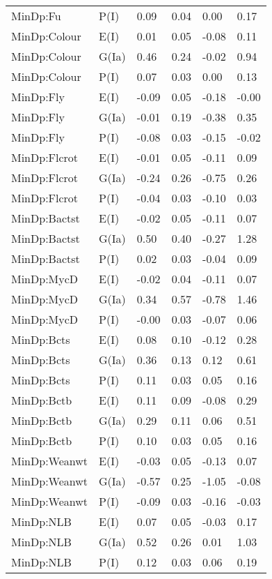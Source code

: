 \begin{center}
\begin{longtable}{|p{1.1in}|p{0.7in}|p{0.7in}|p{0.6in}|p{0.6in}|p{0.6in}|}
  MinDp:Fu & P(I) & 0.09 & 0.04 & 0.00 & 0.17 \\ 
  MinDp:Colour & E(I) & 0.01 & 0.05 & -0.08 & 0.11 \\ 
  MinDp:Colour & G(Ia) & 0.46 & 0.24 & -0.02 & 0.94 \\ 
  MinDp:Colour & P(I) & 0.07 & 0.03 & 0.00 & 0.13 \\ 
  MinDp:Fly & E(I) & -0.09 & 0.05 & -0.18 & -0.00 \\ 
  MinDp:Fly & G(Ia) & -0.01 & 0.19 & -0.38 & 0.35 \\ 
  MinDp:Fly & P(I) & -0.08 & 0.03 & -0.15 & -0.02 \\ 
  MinDp:Flcrot & E(I) & -0.01 & 0.05 & -0.11 & 0.09 \\ 
  MinDp:Flcrot & G(Ia) & -0.24 & 0.26 & -0.75 & 0.26 \\ 
  MinDp:Flcrot & P(I) & -0.04 & 0.03 & -0.10 & 0.03 \\ 
  MinDp:Bactst & E(I) & -0.02 & 0.05 & -0.11 & 0.07 \\ 
  MinDp:Bactst & G(Ia) & 0.50 & 0.40 & -0.27 & 1.28 \\ 
  MinDp:Bactst & P(I) & 0.02 & 0.03 & -0.04 & 0.09 \\ 
  MinDp:MycD & E(I) & -0.02 & 0.04 & -0.11 & 0.07 \\ 
  MinDp:MycD & G(Ia) & 0.34 & 0.57 & -0.78 & 1.46 \\ 
  MinDp:MycD & P(I) & -0.00 & 0.03 & -0.07 & 0.06 \\ 
  MinDp:Bcts & E(I) & 0.08 & 0.10 & -0.12 & 0.28 \\ 
  MinDp:Bcts & G(Ia) & 0.36 & 0.13 & 0.12 & 0.61 \\ 
  MinDp:Bcts & P(I) & 0.11 & 0.03 & 0.05 & 0.16 \\ 
  MinDp:Bctb & E(I) & 0.11 & 0.09 & -0.08 & 0.29 \\ 
  MinDp:Bctb & G(Ia) & 0.29 & 0.11 & 0.06 & 0.51 \\ 
  MinDp:Bctb & P(I) & 0.10 & 0.03 & 0.05 & 0.16 \\ 
  MinDp:Weanwt & E(I) & -0.03 & 0.05 & -0.13 & 0.07 \\ 
  MinDp:Weanwt & G(Ia) & -0.57 & 0.25 & -1.05 & -0.08 \\ 
  MinDp:Weanwt & P(I) & -0.09 & 0.03 & -0.16 & -0.03 \\ 
  MinDp:NLB & E(I) & 0.07 & 0.05 & -0.03 & 0.17 \\ 
  MinDp:NLB & G(Ia) & 0.52 & 0.26 & 0.01 & 1.03 \\ 
  MinDp:NLB & P(I) & 0.12 & 0.03 & 0.06 & 0.19 \\ 

\end{longtable}
\end{center}
